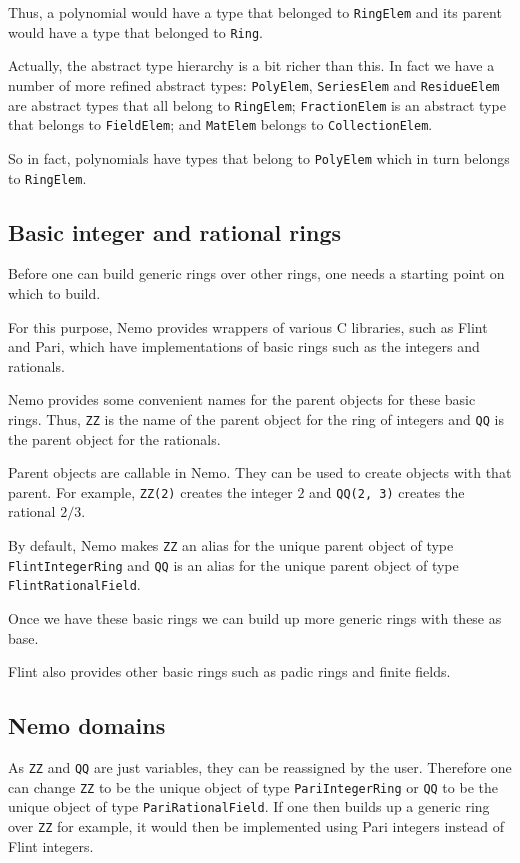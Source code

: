\documentclass[a4paper,10pt]{article}
\newcommand{\code}{\lstinline}
\begin{document}
Thus, a polynomial would have a type that belonged to \code{RingElem} and its parent would have a type
that belonged to \code{Ring}.

Actually, the abstract type hierarchy is a bit richer than this. In fact we have a number of more
refined abstract types: \code{PolyElem}, \code{SeriesElem} and \code{ResidueElem} are abstract types
that all belong to \code{RingElem}; \code{FractionElem} is an abstract type that belongs to
\code{FieldElem}; and \code{MatElem} belongs to \code{CollectionElem}.

So in fact, polynomials have types that belong to \code{PolyElem} which in turn belongs to
\code{RingElem}.

\subsection{Basic integer and rational rings}

Before one can build generic rings over other rings, one needs a starting point on which to build.

For this purpose, Nemo provides wrappers of various C libraries, such as Flint and Pari, which have
implementations of basic rings such as the integers and rationals.

Nemo provides some convenient names for the parent objects for these basic rings. Thus, \code{ZZ} is
the name of the parent object for the ring of integers and \code{QQ} is the parent object for the
rationals.

Parent objects are callable in Nemo. They can be used to create objects with that parent. For example,
\code{ZZ(2)} creates the integer $2$ and \code{QQ(2, 3)} creates the rational $2/3$.

By default, Nemo makes \code{ZZ} an alias for the unique parent object of type \code{FlintIntegerRing}
and \code{QQ} is an alias for the unique parent object of type \code{FlintRationalField}.

Once we have these basic rings we can build up more generic rings with these as base.

Flint also provides other basic rings such as padic rings and finite fields. 

\subsection{Nemo domains}

As \code{ZZ} and \code{QQ} are just variables, they can be reassigned by the user. Therefore one can
change \code{ZZ} to be the unique object of type \code{PariIntegerRing} or \code{QQ} to be the unique
object of type \code{PariRationalField}. If one then builds up a generic ring over \code{ZZ} for
example, it would then be implemented using Pari integers instead of Flint integers.
\end{document}
